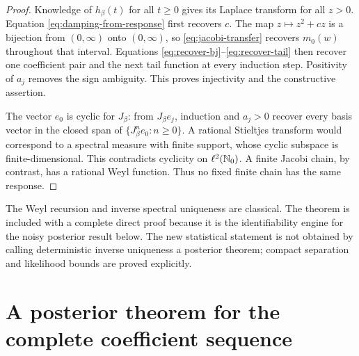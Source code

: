 \begin{proof}
Knowledge of \(h_\beta(t)\) for all \(t\ge0\) gives its Laplace transform for
all \(z>0\).  Equation \eqref{eq:damping-from-response} first recovers \(c\).
The map \(z\mapsto z^2+cz\) is a bijection from \((0,\infty)\) onto
\((0,\infty)\), so \eqref{eq:jacobi-transfer} recovers \(m_0(w)\) throughout
that interval.  Equations \eqref{eq:recover-bj}--\eqref{eq:recover-tail} then
recover one coefficient pair and the next tail function at every induction
step.  Positivity of \(a_j\) removes the sign ambiguity.  This proves
injectivity and the constructive assertion.

The vector \(e_0\) is cyclic for \(J_\beta\): from
\(J_\beta e_j\), induction and \(a_j>0\) recover every basis vector in the
closed span of \(\{J_\beta^ne_0:n\ge0\}\).  A rational Stieltjes transform
would correspond to a spectral measure with finite support, whose cyclic
subspace is finite-dimensional.  This contradicts cyclicity on
\(\ell^2(\mathbb N_0)\).  A finite Jacobi chain, by contrast, has a rational Weyl
function.  Thus no fixed finite chain has the same response.
\end{proof}

\begin{remark}
The Weyl recursion and inverse spectral uniqueness are classical.  The theorem
is included with a complete direct proof because it is the identifiability
engine for the noisy posterior result below.  The new statistical statement
is not obtained by calling deterministic inverse uniqueness a posterior
theorem; compact separation and likelihood bounds are proved explicitly.
\end{remark}

\section{A posterior theorem for the complete coefficient sequence}
\label{sec:jacobi-statistics}

